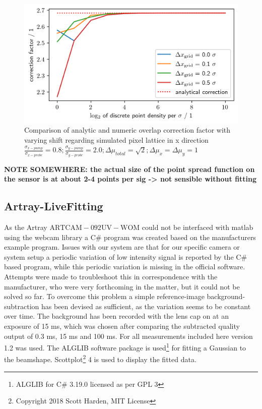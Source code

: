 \documentclass[twoside,openright]{scrreprt}
\begin{document}
\begin{figure}[h]
\centering
\includegraphics[width=0.9\linewidth]{images/NumericalCorrectionShiftedBeams.png}
\caption{Comparison of analytic  and numeric overlap correction factor with varying shift regarding simulated pixel lattice in x direction
\\$\frac{\sigma_{x-pump}}{\sigma_{x-probe}}=0.8;\frac{\sigma_{y-pump}}{\sigma_{y-probe}}=2.0;\Delta\mu_{total} = \sqrt{2}; \Delta\mu_x = \Delta\mu_y = 1$\label{fig:NumericalCorrectionShift}}
\end{figure}
\textbf{NOTE SOMEWHERE: the actual size of the point spread function on the sensor is at about 2-4 points per sig -> not sensible without fitting}

\subsection{Artray-LiveFitting}\label{Sec:LiveFitting}
As the Artray $\mathrm{ARTCAM-092UV-WOM}$ could not be interfaced with matlab using the webcam library a C\# program was created based on the manufacturers example program.
Issues with our system are that for our specific camera or system setup a periodic variation of low intensity signal is reported by the C\# based program, while this periodic variation is missing in the official software. Attempts were made to troubleshoot this in correspondence with the manufacturer, who were very forthcoming in the matter, but it could not be solved so far. To overcome this problem a simple reference-image background-subtraction has been devised as sufficient, as the variation seems to be constant over time. The background has been recorded with the lens cap on at an exposure of 15 ms, which was chosen after comparing the subtracted quality output of 0.3 ms, 15 ms and 100 ms. 
\newline
For all measurements included here version 1.2 was used. The  ALGLIB software package is used\footnote{ALGLIB for C\# 3.19.0 licensed as per GPL 3} for fitting a Gaussian to the beamshape. Scottplot\footnote{Copyright 2018 Scott Harden, MIT License} 4 is used to display the fitted data.\\
\end{document}
